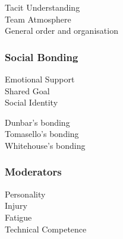 
          \begin{description}
                \item [Tacit Understanding]
                \item [Team Atmosphere]
                \item [General order and organisation]
          \end{description}


      \subsubsection{Social Bonding}


              \begin{description}
                \item [Emotional Support]
                \item [Shared Goal]
                \item [Social Identity]
              \end{description}


            \begin{description}
              \item [Dunbar's bonding]
              \item [Tomasello's bonding]
              \item [Whitehouse's bonding]
            \end{description}


      \subsubsection{Moderators}


            \begin{description}
              \item [Personality]
              \item [Injury]
              \item [Fatigue]
              \item [Technical Competence]
            \end{description}


